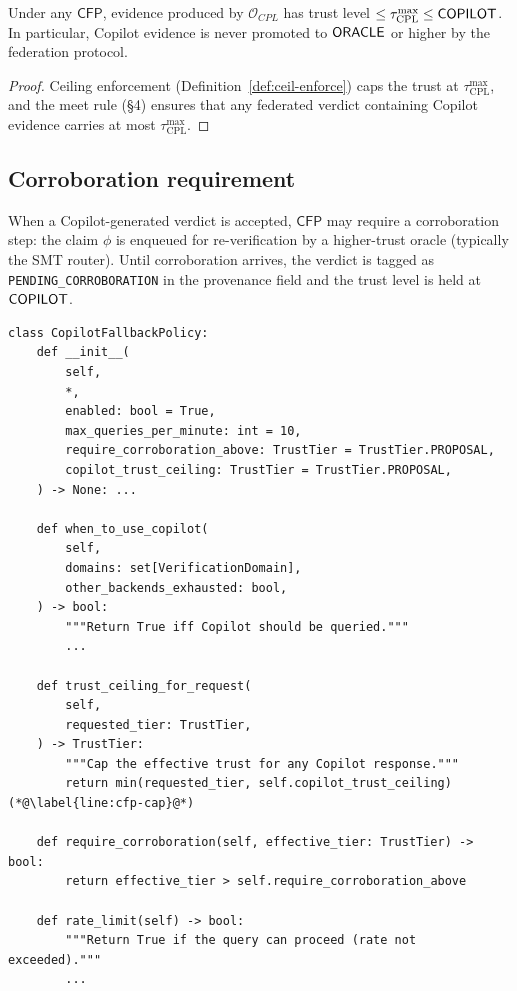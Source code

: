 \documentclass[11pt]{article}
\newcommand{\Oracle}{\mathcal{O}}            %
\newcommand{\Orcl}[1]{\Oracle_{#1}}         %
\newcommand{\CFP}{\mathsf{CFP}}             %
\begin{document}
\begin{proposition}\label{prop:copilot-trust}
  Under any $\CFP$, evidence produced by $\Orcl{CPL}$ has trust level
  $\leq \tau^{\max}_{\mathrm{CPL}} \leq \mathsf{COPILOT}$.
  In particular, Copilot evidence is never promoted to $\mathsf{ORACLE}$ or
  higher by the federation protocol.
\end{proposition}
\begin{proof}
  Ceiling enforcement (Definition~\ref{def:ceil-enforce}) caps the trust
  at $\tau^{\max}_{\mathrm{CPL}}$, and the meet rule (§4) ensures that
  any federated verdict containing Copilot evidence carries at most
  $\tau^{\max}_{\mathrm{CPL}}$.
\end{proof}

\subsection{Corroboration requirement}

When a Copilot-generated verdict is accepted, $\CFP$ may require a
corroboration step: the claim $\phi$ is enqueued for re-verification by
a higher-trust oracle (typically the SMT router).  Until corroboration
arrives, the verdict is tagged as \texttt{PENDING\_CORROBORATION} in the
provenance field and the trust level is held at $\mathsf{COPILOT}$.

\begin{lstlisting}[style=jugeo-python, caption={%
  \texttt{CopilotFallbackPolicy} key interface (simplified from
  \texttt{src/jugeo/solver/router.py}).}]
class CopilotFallbackPolicy:
    def __init__(
        self,
        *,
        enabled: bool = True,
        max_queries_per_minute: int = 10,
        require_corroboration_above: TrustTier = TrustTier.PROPOSAL,
        copilot_trust_ceiling: TrustTier = TrustTier.PROPOSAL,
    ) -> None: ...

    def when_to_use_copilot(
        self,
        domains: set[VerificationDomain],
        other_backends_exhausted: bool,
    ) -> bool:
        """Return True iff Copilot should be queried."""
        ...

    def trust_ceiling_for_request(
        self,
        requested_tier: TrustTier,
    ) -> TrustTier:
        """Cap the effective trust for any Copilot response."""
        return min(requested_tier, self.copilot_trust_ceiling)  (*@\label{line:cfp-cap}@*)

    def require_corroboration(self, effective_tier: TrustTier) -> bool:
        return effective_tier > self.require_corroboration_above

    def rate_limit(self) -> bool:
        """Return True if the query can proceed (rate not exceeded)."""
        ...
\end{lstlisting}
\end{document}
